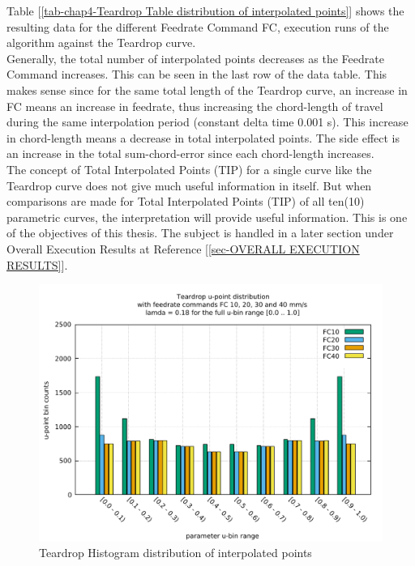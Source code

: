 Table [\ref{tab-chap4-Teardrop Table distribution of interpolated points}] shows the resulting data for the different Feedrate Command FC, execution runs of the algorithm against the Teardrop curve. \\

Generally, the total number of interpolated points decreases as the Feedrate Command increases. This can be seen in the last row of the data table. This makes sense since for the same total length of the Teardrop curve, an increase in FC means an increase in feedrate, thus increasing the chord-length of travel during the same interpolation period (constant delta time 0.001 s). This increase in chord-length means a decrease in total interpolated points. The side effect is an increase in the total sum-chord-error since each chord-length increases.\\

The concept of Total Interpolated Points (TIP) for a single curve like the Teardrop curve does not give much useful information in itself. But when comparisons are made for Total Interpolated Points (TIP) of all ten(10) parametric curves, the interpretation will provide useful information. This is one of the objectives of this thesis. The subject is handled in a later section under Overall Execution Results at Reference [\ref{sec-OVERALL EXECUTION RESULTS}].  


\clearpage
\pagebreak

\begin{figure}
	\centering
	\caption    {Teardrop Histogram distribution of interpolated points}
	\label  {fig-chap4-Teardrop Histogram distribution of interpolated points}
	\includegraphics[width=1.00\textwidth]{Chap4/Teardrop/distributions/Teardrop-u-distribution-FCXX-L018-Algo28.pdf} 
	
\end{figure}


